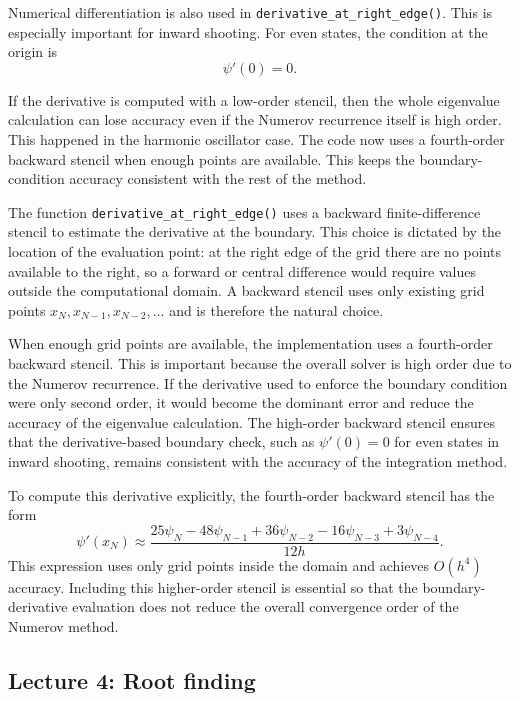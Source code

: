 \documentclass[11pt]{article}
\begin{document}
    Numerical differentiation is also used in \texttt{derivative\_at\_right\_edge()}. This is especially important for inward shooting. For even states, the condition at the origin is
    \begin{equation}
        \psi'(0)=0.
    \end{equation}


    If the derivative is computed with a low-order stencil, then the whole eigenvalue calculation can lose accuracy even if the Numerov recurrence itself is high order. This happened in the harmonic oscillator case. The code now uses a fourth-order backward stencil when enough points are available. This keeps the boundary-condition accuracy consistent with the rest of the method.

    The function \texttt{derivative\_at\_right\_edge()} uses a backward finite-difference stencil to estimate the derivative at the boundary. This choice is dictated by the location of the evaluation point: at the right edge of the grid there are no points available to the right, so a forward or central difference would require values outside the computational domain. A backward stencil uses only existing grid points $x_N, x_{N-1}, x_{N-2}, \ldots$ and is therefore the natural choice.

    When enough grid points are available, the implementation uses a fourth-order backward stencil. This is important because the overall solver is high order due to the Numerov recurrence. If the derivative used to enforce the boundary condition were only second order, it would become the dominant error and reduce the accuracy of the eigenvalue calculation. The high-order backward stencil ensures that the derivative-based boundary check, such as $\psi'(0)=0$ for even states in inward shooting, remains consistent with the accuracy of the integration method.

    To compute this derivative explicitly, the fourth-order backward stencil has the form
    \begin{equation}
        \psi'(x_N) \approx
        \frac{25\psi_N - 48\psi_{N-1} + 36\psi_{N-2} - 16\psi_{N-3} + 3\psi_{N-4}}{12h}.
    \end{equation}
    This expression uses only grid points inside the domain and achieves $O(h^4)$ accuracy. Including this higher-order stencil is essential so that the boundary-derivative evaluation does not reduce the overall convergence order of the Numerov method.

    \subsection{Lecture 4: Root finding}
\end{document}
